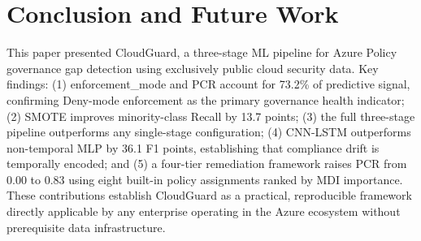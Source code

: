 \documentclass[conference]{IEEEtran}
\begin{document}
\section{Conclusion and Future Work}

This paper presented CloudGuard, a three-stage ML pipeline for Azure 
Policy governance gap detection using exclusively public cloud security 
data. Key findings: (1) enforcement\_mode and PCR account for 73.2\% 
of predictive signal, confirming Deny-mode enforcement as the primary 
governance health indicator; (2) SMOTE improves minority-class Recall 
by 13.7 points; (3) the full three-stage pipeline outperforms any 
single-stage configuration; (4) CNN-LSTM outperforms non-temporal 
MLP by 36.1 F1 points, establishing that compliance drift is temporally 
encoded; and (5) a four-tier remediation framework raises PCR from 0.00 
to 0.83 using eight built-in policy assignments ranked by MDI importance.
These contributions establish CloudGuard as a practical, reproducible 
framework directly applicable by any enterprise operating in the Azure 
ecosystem without prerequisite data infrastructure.
\end{document}
